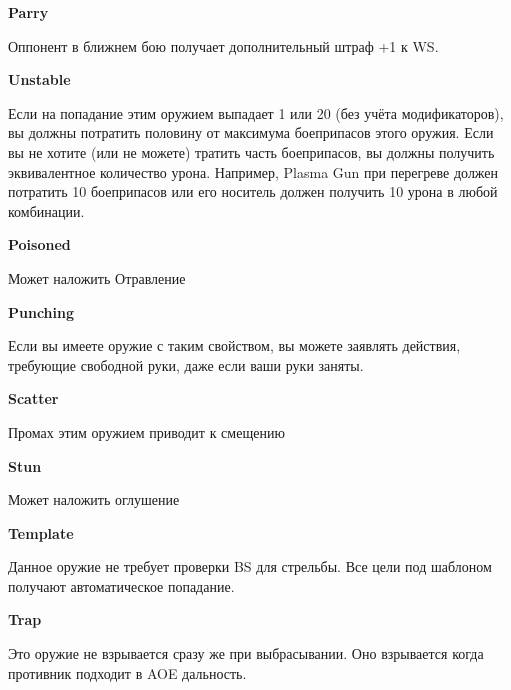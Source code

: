 \begin{multicols}{2}
\textbf{Parry}

Оппонент в ближнем бою получает дополнительный штраф +1 к WS.

\textbf{Unstable}

Если на попадание этим оружием выпадает 1 или 20 (без учёта модификаторов), вы должны потратить половину от максимума боеприпасов этого оружия.
Если вы не хотите (или не можете) тратить часть боеприпасов, вы должны получить эквивалентное количество урона.
Например, Plasma Gun при перегреве должен потратить 10 боеприпасов или его носитель должен получить 10 урона в любой комбинации.

\textbf{Poisoned}

Может наложить Отравление

\textbf{Punching}

Если вы имеете оружие с таким свойством, вы можете заявлять действия, требующие свободной руки, даже если ваши руки заняты.

\textbf{Scatter}

Промах этим оружием приводит к смещению

\textbf{Stun}

Может наложить оглушение

\textbf{Template}

Данное оружие не требует проверки BS для стрельбы. Все цели под шаблоном получают автоматическое попадание.

\textbf{Trap}

Это оружие не взрывается сразу же при выбрасывании. Оно взрывается когда противник подходит в AOE дальность.

\end{multicols}